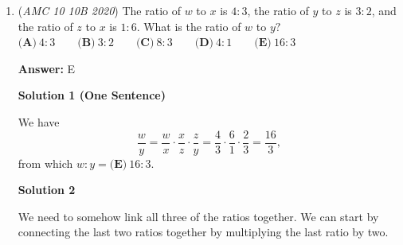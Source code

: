 \begin{enumerate}
 \textbf{Answer: }E



\textbf{Solution 1}

A cube with side length $1$ has volume $1^3=1$, so $5$ of these will have a total volume of $5\cdot1=5$.

 A cube with side length $2$ has volume $2^3=8$, so $5$ of these will have a total volume of $5\cdot8=40$.

 $5+40=\boxed{\textbf{(E) }45}$.

 



\textbf{Solution 2 (more in depth about Solution 1)}

The total volume of Carl's cubes is $5$. This is because to find the volume of a cube or a rectangular prism, you have to multiply the height by the length by the width. So in this question, it would be $1 \times 1 \times 1$. This is equal to $1$. Since Carl has $5$ cubes, you will have to multiply $1$ by $5$, to account for all the $5$ cubes.

 Next, to find the total volume of Kate's cubes you have to do the same thing. Except, this time, the height, the width, and the length, are all $2$, so it will be $2 \times 2 \times 2 = 8.$ Now you have to multiply by $5$ to account for all the $5$ blocks. This is $40$. So the total volume of Kate's cubes is $40$.

 Lastly, to find the total of Carl's and Kate's cubes, you must add the total volume of their cubes together. This is going to be $5+40=\boxed{\textbf{(E)} ~45}$.

 


	\item (\textit{AMC 10 10B 2020}) The ratio of $w$ to $x$ is $4:3$, the ratio of $y$ to $z$ is $3:2$, and the ratio of $z$ to $x$ is $1:6$. What is the ratio of $w$ to $y?$
$\textbf{(A)}\ 4:3 \qquad\textbf{(B)}\ 3:2 \qquad\textbf{(C)}\  8:3 \qquad\textbf{(D)}\ 4:1 \qquad\textbf{(E)}\ 16:3$

 \textbf{Answer: }E



\textbf{Solution 1 (One Sentence)}

We have 
 \[\frac wy = \frac wx \cdot \frac xz \cdot \frac zy = \frac43\cdot\frac61\cdot\frac23=\frac{16}{3},\] from which $w:y=\boxed{\textbf{(E)}\ 16:3}.$




\textbf{Solution 2}

We need to somehow link all three of the ratios together. We can start by connecting the last two ratios together by multiplying the last ratio by two. 


\end{enumerate}
